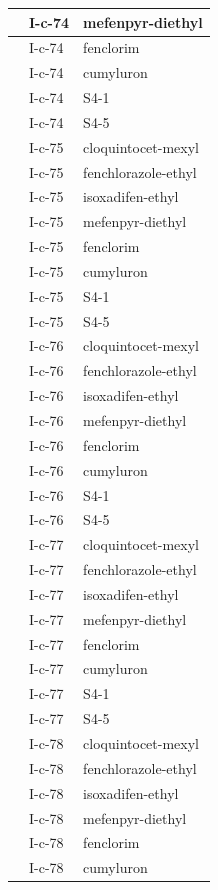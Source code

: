 \documentclass[11pt,a4paper]{article}
\begin{document}
\begin{table}[h]
\begin{tabular}{|l|l|l|}
 & I-c-74 & mefenpyr-diethyl \\ \hline
 & I-c-74 & fenclorim \\ \hline
 & I-c-74 & cumyluron \\ \hline
 & I-c-74 & S4-1 \\ \hline
 & I-c-74 & S4-5 \\ \hline
 & I-c-75 & cloquintocet-mexyl \\ \hline
 & I-c-75 & fenchlorazole-ethyl \\ \hline
 & I-c-75 & isoxadifen-ethyl \\ \hline
 & I-c-75 & mefenpyr-diethyl \\ \hline
 & I-c-75 & fenclorim \\ \hline
 & I-c-75 & cumyluron \\ \hline
 & I-c-75 & S4-1 \\ \hline
 & I-c-75 & S4-5 \\ \hline
 & I-c-76 & cloquintocet-mexyl \\ \hline
 & I-c-76 & fenchlorazole-ethyl \\ \hline
 & I-c-76 & isoxadifen-ethyl \\ \hline
 & I-c-76 & mefenpyr-diethyl \\ \hline
 & I-c-76 & fenclorim \\ \hline
 & I-c-76 & cumyluron \\ \hline
 & I-c-76 & S4-1 \\ \hline
 & I-c-76 & S4-5 \\ \hline
 & I-c-77 & cloquintocet-mexyl \\ \hline
 & I-c-77 & fenchlorazole-ethyl \\ \hline
 & I-c-77 & isoxadifen-ethyl \\ \hline
 & I-c-77 & mefenpyr-diethyl \\ \hline
 & I-c-77 & fenclorim \\ \hline
 & I-c-77 & cumyluron \\ \hline
 & I-c-77 & S4-1 \\ \hline
 & I-c-77 & S4-5 \\ \hline
 & I-c-78 & cloquintocet-mexyl \\ \hline
 & I-c-78 & fenchlorazole-ethyl \\ \hline
 & I-c-78 & isoxadifen-ethyl \\ \hline
 & I-c-78 & mefenpyr-diethyl \\ \hline
 & I-c-78 & fenclorim \\ \hline
 & I-c-78 & cumyluron \\ \hline

\end{tabular}
\end{table}
\end{document}
